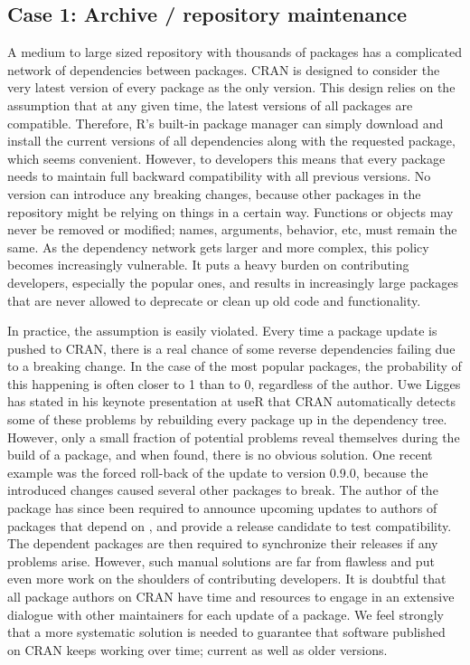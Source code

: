\subsection{Case 1: Archive / repository maintenance}

A medium to large sized repository with thousands of packages has a complicated
network of dependencies between packages. CRAN is designed to consider the very
latest version of every package as the only  version. This design
relies on the assumption that at any given time, the latest versions
of all packages are compatible. Therefore, R's built-in package manager can simply
download and install the current versions of all dependencies along with the
requested package, which seems convenient. However, to developers this means
that every package   needs to maintain full backward compatibility
with all previous versions. No version can introduce any breaking changes, because
other packages in the repository might be relying on things in a certain way.
Functions or objects may never be removed or modified; names, arguments, behavior,
etc, must remain the same. As the dependency network gets larger and more complex,
this policy becomes increasingly vulnerable. It puts a heavy burden on
contributing developers, especially the popular ones, and results in
increasingly large packages that are never allowed to deprecate or clean up
old code and functionality.

In practice, the assumption is easily violated. Every time a package update is
pushed to CRAN, there is a real chance of some reverse dependencies failing due
to a breaking change. In the case of the most popular packages, the probability
of this happening is often closer to 1 than to 0, regardless of the author. Uwe
Ligges has stated in his keynote presentation at useR that CRAN automatically
detects some of these problems by rebuilding every package up in the dependency
tree. However, only a small fraction of potential problems reveal themselves
during the build of a package, and when found, there is no obvious solution. One
recent example was the forced roll-back of the  \citep{ggplot2}
update to version 0.9.0, because the introduced changes caused several other
packages to break. The author of the  package has since been
required to announce upcoming updates to authors of packages that depend on
, and provide a release candidate to test compatibility. The
dependent packages are then required to synchronize their releases if any
problems arise. However, such manual solutions are far from flawless and put
even more work on the shoulders of contributing developers. It is doubtful that
all package authors on CRAN have time and resources to engage in an extensive
dialogue with other maintainers for each update of a package. We feel strongly
that a more systematic solution is needed to guarantee that software published
on CRAN keeps working over time; current as well as older versions.

